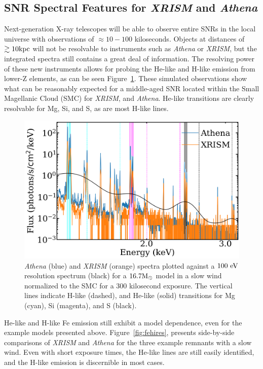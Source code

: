 \documentclass[twocolumn]{aastex631}
\begin{document}
\subsection{SNR Spectral Features for \textit{XRISM} and \textit{Athena}}
\label{nextgenspec}
\indent Next-generation X-ray telescopes will be able to observe entire SNRs in the local universe with observations of $\approx 10-100$ kiloseconds. Objects at distances of $\gtrsim 10 \rm kpc$ will not be resolvable to instruments such as \textit{Athena} or \textit{XRISM},  but the integrated spectra still contains a great deal of information. The resolving power of these new instruments allows for probing the He-like and H-like emission from lower-Z elements, as can be seen Figure~\ref{fig:midxray}. These simulated observations show what can be reasonably expected for a middle-aged SNR located within the Small Magellanic Cloud (SMC) for \textit{XRISM}, and \textit{Athena}.  He-like transitions are clearly resolvable for Mg, Si, and S, as are most H-like lines.  
\begin{figure}[htb]
    \centering
    \includegraphics[scale=0.23]{XRISMvSimX.png}
    \caption{{\it Athena} (blue) and {\it XRISM} (orange) spectra plotted against a $100\  \rm eV$ resolution spectrum (black) for a $16.7 \rm M_{\odot}$ model in a slow wind normalized to the SMC for a 300 kilosecond exposure. The vertical lines indicate H-like (dashed), and He-like (solid) transitions for Mg (cyan), Si (magenta), and S (black).}
    \label{fig:midxray}
\end{figure}
He-like and H-like Fe emission still exhibit a model dependence, even for the example models presented above. Figure~\ref{fig:fehires}, presents side-by-side comparisons of \textit{XRISM} and \textit{Athena} for the three example remnants with a slow wind. Even with short exposure times, the He-like lines are still easily identified, and the H-like emission is discernible in most cases. 
\end{document}
